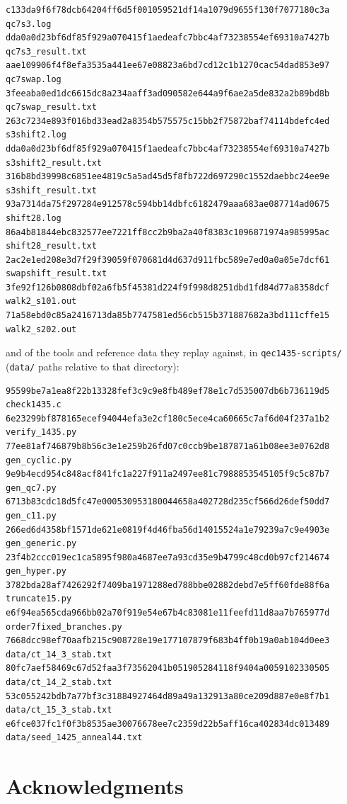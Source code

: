 \documentclass[11pt]{amsart}
\theoremstyle{plain}
\theoremstyle{definition}
\theoremstyle{remark}
\begin{document}
{\begin{verbatim}
c133da9f6f78dcb64204ff6d5f001059521df14a1079d9655f130f7077180c3a  qc7s3.log
dda0a0d23bf6df85f929a070415f1aedeafc7bbc4af73238554ef69310a7427b  qc7s3_result.txt
aae109906f4f8efa3535a441ee67e08823a6bd7cd12c1b1270cac54dad853e97  qc7swap.log
3feeaba0ed1dc6615dc8a234aaff3ad090582e644a9f6ae2a5de832a2b89bd8b  qc7swap_result.txt
263c7234e893f016bd33ead2a8354b575575c15bb2f75872baf74114bdefc4ed  s3shift2.log
dda0a0d23bf6df85f929a070415f1aedeafc7bbc4af73238554ef69310a7427b  s3shift2_result.txt
316b8bd39998c6851ee4819c5a5ad45d5f8fb722d697290c1552daebbc24ee9e  s3shift_result.txt
93a7314da75f297284e912578c594bb14dbfc6182479aaa683ae087714ad0675  shift28.log
86a4b81844ebc832577ee7221ff8cc2b9ba2a40f8383c1096871974a985995ac  shift28_result.txt
2ac2e1ed208e3d7f29f39059f070681d4d637d911fbc589e7ed0a0a05e7dcf61  swapshift_result.txt
3fe92f126b0808dbf02a6fb5f45381d224f9f998d8251dbd1fd84d77a8358dcf  walk2_s101.out
71a58ebd0c85a2416713da85b7747581ed56cb515b371887682a3bd111cffe15  walk2_s202.out
\end{verbatim}
}

\noindent and of the tools and reference data they replay against, in
\texttt{qec1435-scripts/} (\texttt{data/} paths relative to that
directory):

{\fontsize{6.3}{6.9}\selectfont
\begin{verbatim}
95599be7a1ea8f22b13328fef3c9c9e8fb489ef78e1c7d535007db6b736119d5  check1435.c
6e23299bf878165ecef94044efa3e2cf180c5ece4ca60665c7af6d04f237a1b2  verify_1435.py
77ee81af746879b8b56c3e1e259b26fd07c0ccb9be187871a61b08ee3e0762d8  gen_cyclic.py
9e9b4ecd954c848acf841fc1a227f911a2497ee81c7988853545105f9c5c87b7  gen_qc7.py
6713b83cdc18d5fc47e000530953180044658a402728d235cf566d26def50dd7  gen_c11.py
266ed6d4358bf1571de621e0819f4d46fba56d14015524a1e79239a7c9e4903e  gen_generic.py
23f4b2ccc019ec1ca5895f980a4687ee7a93cd35e9b4799c48cd0b97cf214674  gen_hyper.py
3782bda28af7426292f7409ba1971288ed788bbe02882debd7e5ff60fde88f6a  truncate15.py
e6f94ea565cda966bb02a70f919e54e67b4c83081e11feefd11d8aa7b765977d  order7fixed_branches.py
7668dcc98ef70aafb215c908728e19e177107879f683b4ff0b19a0ab104d0ee3  data/ct_14_3_stab.txt
80fc7aef58469c67d52faa3f73562041b051905284118f9404a0059102330505  data/ct_14_2_stab.txt
53c055242bdb7a77bf3c31884927464d89a49a132913a80ce209d887e0e8f7b1  data/ct_15_3_stab.txt
e6fce037fc1f0f3b8535ae30076678ee7c2359d22b5aff16ca402834dc013489  data/seed_1425_anneal44.txt
\end{verbatim}
}

\section*{Acknowledgments}
\end{document}

